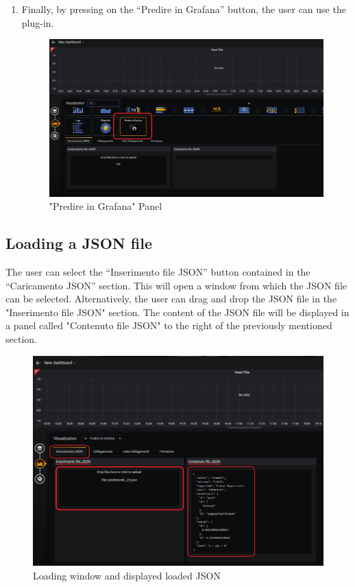 \begin{enumerate}
	\item Finally, by pressing on the “Predire in Grafana” button, the user can use the plug-in.
	
\begin{figure}[H]
\centering
\includegraphics[scale=0.55]{img/plug-in/selection_ball.jpg}
\caption{"Predire in Grafana" Panel}
\end{figure}

\end{enumerate}

	
\subsection{Loading a JSON file}
The user can select the “Inserimento file JSON” button contained in the “Caricamento JSON” section.
This will open a window from which the JSON file can be selected.
Alternatively, the user can drag and drop the JSON file in the "Inserimento file JSON" section.
The content of the JSON file will be displayed in a panel called "Contenuto file JSON" to the right of the previously mentioned section.

\begin{figure}[H]
\centering
\includegraphics[scale=0.65]{img/plug-in/loading_js.jpg}
\caption{Loading window and displayed loaded JSON}
\end{figure}


